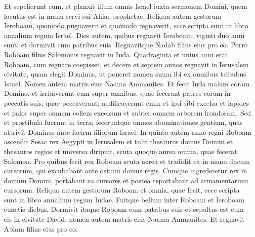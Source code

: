 \begin{biblechapter}
\begin{biblechapter}
\begin{biblechapter}
\begin{biblechapter}
\begin{biblechapter}
\begin{biblechapter}
\begin{biblechapter}
\begin{biblechapter}
\begin{biblechapter}
\begin{biblechapter}
\begin{biblechapter}
\begin{biblechapter}
\begin{biblechapter}
\begin{biblechapter}
\verse Et sepelierunt eum, et planxit illum omnis Israel iuxta sermonem Domini, quem locutus est in manu servi sui Ahiae prophetae.
 \verse Reliqua autem gestorum Ieroboam, quomodo pugnaverit et quomodo regnaverit, ecce scripta sunt in libro annalium regum Israel. 
\verse Dies autem, quibus regnavit Ieroboam, viginti duo anni sunt; et dormivit cum patribus suis. Regnavitque Nadab filius eius pro eo.
 \verse Porro Roboam filius Salomonis regnavit in Iuda. Quadraginta et unius anni erat Roboam, cum regnare coepisset, et decem et septem annos regnavit in Ierusalem civitate, quam elegit Dominus, ut poneret nomen suum ibi ex omnibus tribubus Israel. Nomen autem matris eius Naama Ammanites.
 \verse Et fecit Iuda malum coram Domino, et irritaverunt eum super omnibus, quae fecerant patres eorum in peccatis suis, quae peccaverant; 
\verse aedificaverunt enim et ipsi sibi excelsa et lapides et palos super omnem collem excelsum et subter omnem arborem frondosam. 
\verse Sed et prostibula fuerunt in terra; feceruntque omnes abominationes gentium, quas attrivit Dominus ante faciem filiorum Israel.
 \verse In quinto autem anno regni Roboam ascendit Sesac rex Aegypti in Ierusalem 
 \verse et tulit thesauros domus Domini et thesauros regios et universa diripuit, scuta quoque aurea omnia, quae fecerat Salomon. 
\verse Pro quibus fecit rex Roboam scuta aerea et tradidit ea in manu ducum cursorum, qui excubabant ante ostium domus regis. 
\verse Cumque ingrederetur rex in domum Domini, portabant ea cursores et postea reportabant ad armamentarium cursorum.
 \verse Reliqua autem gestorum Roboam et omnia, quae fecit, ecce scripta sunt in libro annalium regum Iudae. 
\verse Fuitque bellum inter Roboam et Ieroboam cunctis diebus. 
\verse Dormivit itaque Roboam cum patribus suis et sepultus est cum eis in civitate David; nomen autem matris eius Naama Ammanites. Et regnavit Abiam filius eius pro eo.
 

\end{biblechapter}
\end{biblechapter}
\end{biblechapter}
\end{biblechapter}
\end{biblechapter}
\end{biblechapter}
\end{biblechapter}
\end{biblechapter}
\end{biblechapter}
\end{biblechapter}
\end{biblechapter}
\end{biblechapter}
\end{biblechapter}
\end{biblechapter}
